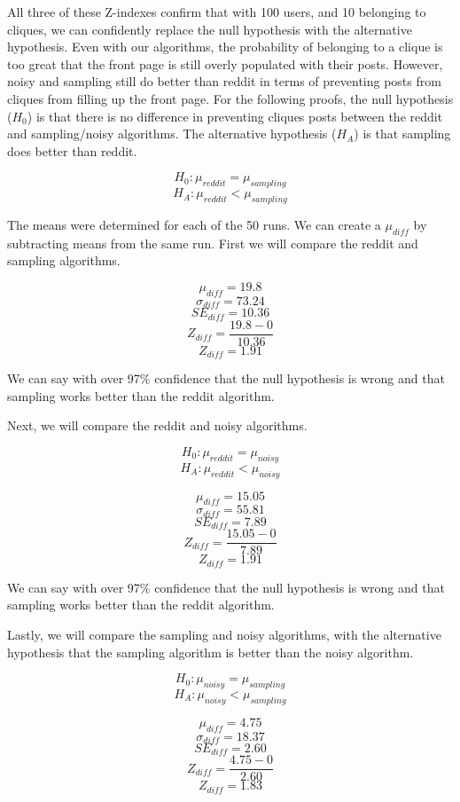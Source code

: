 \documentclass[12pt, oneside]{amsart}
\begin{document}
All three of these Z-indexes confirm that with 100 users, and 10 belonging to cliques, we can confidently replace the null hypothesis with the alternative hypothesis.  Even with our algorithms, the probability of belonging to a clique is too great that the front page is still overly populated with their posts.  However, noisy and sampling still do better than reddit in terms of preventing posts from cliques from filling up the front page.  For the following proofs, the null hypothesis ($H_0$) is that there is no difference in preventing cliques posts between the reddit and sampling/noisy algorithms.  The alternative hypothesis ($H_A$) is that sampling does better than reddit.  

$$H_0: \mu_{reddit} = \mu_{sampling}$$
$$H_A: \mu_{reddit} < \mu_{sampling}$$

The means were determined for each of the 50 runs.  We can create a $\mu_{diff}$ by subtracting means from the same run.  First we will compare the reddit and sampling algorithms.

$$\mu_{diff} = 19.8$$
$$\sigma_{diff} = 73.24$$
$$SE_{diff} = 10.36$$
$$Z_{diff} = \frac{19.8 - 0}{10.36}$$
$$Z_{diff} = 1.91$$

We can say with over 97\% confidence that the null hypothesis is wrong and that sampling works better than the reddit algorithm.  

\vspace{.2cm}

Next, we will compare the reddit and noisy algorithms.

$$H_0: \mu_{reddit} = \mu_{noisy}$$
$$H_A: \mu_{reddit} < \mu_{noisy}$$

$$\mu_{diff} = 15.05$$
$$\sigma_{diff} = 55.81$$
$$SE_{diff} = 7.89$$
$$Z_{diff} = \frac{15.05 - 0}{7.89}$$
$$Z_{diff} = 1.91$$

We can say with over 97\% confidence that the null hypothesis is wrong and that sampling works better than the reddit algorithm.

\vspace{.2cm}

Lastly, we will compare the sampling and noisy algorithms, with the alternative hypothesis that the sampling algorithm is better than the noisy algorithm.

$$H_0: \mu_{noisy} = \mu_{sampling}$$
$$H_A: \mu_{noisy} < \mu_{sampling}$$

$$\mu_{diff} = 4.75$$
$$\sigma_{diff} = 18.37$$
$$SE_{diff} = 2.60$$
$$Z_{diff} = \frac{4.75 - 0}{2.60}$$
$$Z_{diff} = 1.83$$
\end{document}

